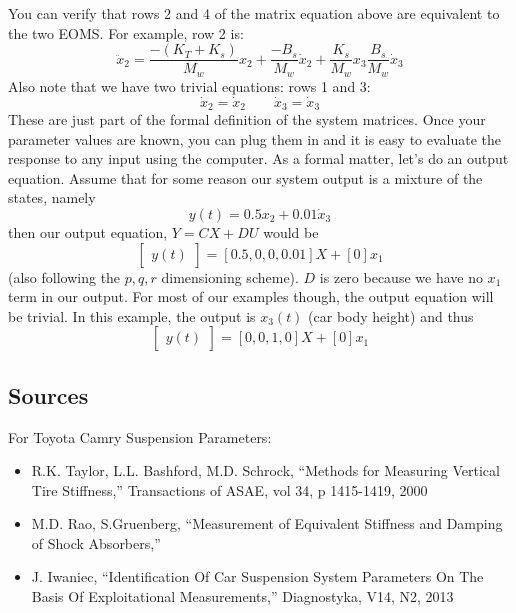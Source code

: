 \begin{ExampleCont}
You can verify that rows 2 and 4 of the matrix equation above are equivalent to the
two EOMS.   For example, row 2 is:
\[
\ddot{x}_{2} = \frac{-(K_T+K_s)}{M_w}x_2+\frac{-B_s}{M_w}\dot{x}_2+\frac{K_s}{M_w}x_3\frac{B_s}{M_w}\dot{x}_3
\]
Also note that we have two trivial equations: rows 1 and 3:
\[
\dot{x}_2 = \dot{x}_2 \qquad \dot{x}_3 = \dot{x}_3
\]
These are just part of the formal definition of the system matrices.
Once your parameter values are known, you can plug them in and it is easy to evaluate the response to any input using the computer.
As a formal matter, let's do an output equation.   Assume that for some reason our
system output is a mixture of the states, namely
\[
y(t) = 0.5x_2 + 0.01\dot{x}_3
\]
 then our output equation, $Y=CX+DU$ would be
\[
\begin{bmatrix}y(t)\end{bmatrix} =
[0.5, 0, 0, 0.01]X + [0] x_1
\]
(also following the $p,q,r$ dimensioning scheme).
$D$ is zero because we have no $x_1$ term in our output.  For most of our examples though,
the output equation will be trivial.  In this example, the output is $x_3(t)$ (car body height)
and thus
\[
\begin{bmatrix}y(t)\end{bmatrix} =
[0,0,1,0]X + [0] x_1
\]
\end{ExampleCont}

%
%



\subsection{Sources}
For Toyota Camry Suspension Parameters:
\begin{itemize}
    \item R.K. Taylor, L.L. Bashford, M.D. Schrock, ``Methods for Measuring Vertical Tire Stiffness,''
    Transactions of ASAE, vol 34, p 1415-1419, 2000
    \item M.D. Rao, S.Gruenberg, ``Measurement of Equivalent Stiffness and Damping of Shock Absorbers,''
    \item J. Iwaniec, ``Identification Of Car Suspension System Parameters On The Basis Of Exploitational Measurements,'' Diagnostyka, V14, N2, 2013
\end{itemize}

